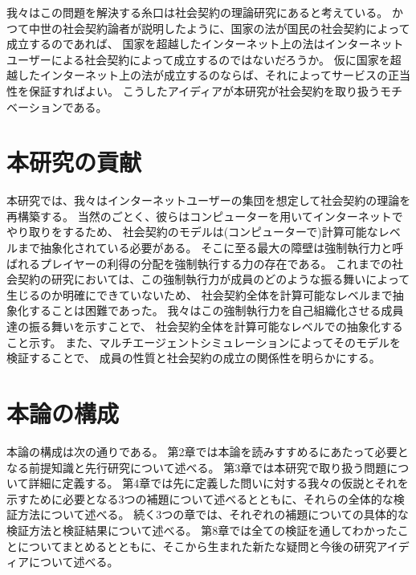   我々はこの問題を解決する糸口は社会契約の理論研究にあると考えている。
  かつて中世の社会契約論者が説明したように、国家の法が国民の社会契約によって成立するのであれば、
  国家を超越したインターネット上の法はインターネットユーザーによる社会契約によって成立するのではないだろうか。
  仮に国家を超越したインターネット上の法が成立するのならば、それによってサービスの正当性を保証すればよい。
  こうしたアイディアが本研究が社会契約を取り扱うモチベーションである。

  \section{本研究の貢献}
  本研究では、我々はインターネットユーザーの集団を想定して社会契約の理論を再構築する。
  当然のごとく、彼らはコンピューターを用いてインターネットでやり取りをするため、
  社会契約のモデルは(コンピューターで)計算可能なレベルまで抽象化されている必要がある。
  そこに至る最大の障壁は強制執行力と呼ばれるプレイヤーの利得の分配を強制執行する力の存在である。
  これまでの社会契約の研究においては、この強制執行力が成員のどのような振る舞いによって生じるのか明確にできていないため、
  社会契約全体を計算可能なレベルまで抽象化することは困難であった。
  我々はこの強制執行力を自己組織化させる成員達の振る舞いを示すことで、
  社会契約全体を計算可能なレベルでの抽象化すること示す。
  また、マルチエージェントシミュレーションによってそのモデルを検証することで、
  成員の性質と社会契約の成立の関係性を明らかにする。

  \section{本論の構成}
  本論の構成は次の通りである。
  第2章では本論を読みすすめるにあたって必要となる前提知識と先行研究について述べる。
  第3章では本研究で取り扱う問題について詳細に定義する。
  第4章では先に定義した問いに対する我々の仮説とそれを示すために必要となる3つの補題について述べるとともに、それらの全体的な検証方法について述べる。
  続く3つの章では、それぞれの補題についての具体的な検証方法と検証結果について述べる。
  第8章では全ての検証を通してわかったことについてまとめるとともに、そこから生まれた新たな疑問と今後の研究アイディアについて述べる。
